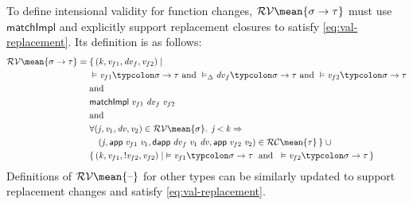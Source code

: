 To define intensional validity for function changes, \ensuremath{\mathcal{RV}\mean{\sigma\to \tau}}
must use \ensuremath{\mathsf{matchImpl}} and explicitly support replacement closures to satisfy
\cref{eq:val-replacement}. Its definition is as follows:
\begin{align*}
  \ensuremath{\mathcal{RV}\mean{\sigma\to \tau}} ={}
                  \ensuremath{&}\{ \, \ensuremath{(\Varid{k},\Varid{v}_{f1},\Varid{dv}_f,\Varid{v}_{f2})\mid\\&\vDash\Varid{v}_{f1}\typcolon\sigma\to \tau\text{ and }\vDash_{\Delta}\Varid{dv}_f\typcolon\sigma\to \tau\text{ and }\vDash\Varid{v}_{f2}\typcolon\sigma\to \tau\\&\text{and}\\&\mathsf{matchImpl}\;\Varid{v}_{f1}\;\Varid{dv}_f\;\Varid{v}_{f2}\\&\text{and}\\&\forall (\Varid{j},\Varid{v}_{1},\Varid{dv},\Varid{v}_{2})\in \mathcal{RV}\mean{\sigma}\hsforall \hsdot{\circ }{\mathpunct{.}}\;\Varid{j}\mathbin{<}\Varid{k}\Rightarrow\\&\quad(\Varid{j},\mathsf{app}\;\Varid{v}_{f1}\;\Varid{v}_{1},\mathsf{dapp}\;\Varid{dv}_f\;\Varid{v}_{1}\;\Varid{dv},\mathsf{app}\;\Varid{v}_{f2}\;\Varid{v}_{2})\in \mathcal{RC}\mean{\tau}} \, \}\ensuremath{\;\cup\\&} \{ \, \ensuremath{(\Varid{k},\Varid{v}_{f1},\mathbin{!}\Varid{v}_{f2},\Varid{v}_{f2})\mid\;\vDash\Varid{v}_{f1}\typcolon\sigma\to \tau\;\text{ and }\;\vDash\Varid{v}_{f2}\typcolon\sigma\to \tau} \, \}
\end{align*}
Definitions of \ensuremath{\mathcal{RV}\mean{\text{\textendash}}} for other types can be similarly updated to support
replacement changes and satisfy \cref{eq:val-replacement}.

